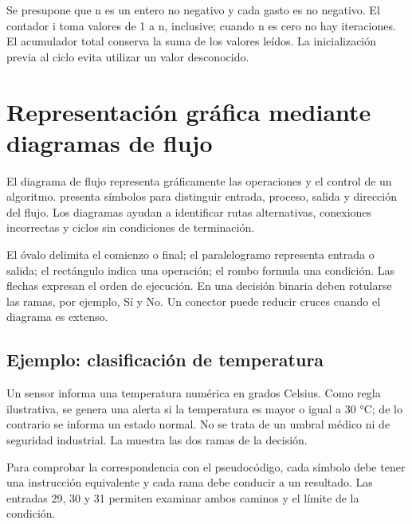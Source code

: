 
Se presupone que n es un entero no negativo y cada gasto es no negativo. El contador i toma valores de 1 a n, inclusive; cuando n es cero no hay iteraciones. El acumulador total conserva la suma de los valores leídos. La inicialización previa al ciclo evita utilizar un valor desconocido.

\section{Representación gráfica mediante diagramas de flujo}

El diagrama de flujo representa gráficamente las operaciones y el control de un algoritmo. \textcite[pp.~16–19]{farrell2013} presenta símbolos para distinguir entrada, proceso, salida y dirección del flujo. Los diagramas ayudan a identificar rutas alternativas, conexiones incorrectas y ciclos sin condiciones de terminación.


El óvalo delimita el comienzo o final; el paralelogramo representa entrada o salida; el rectángulo indica una operación; el rombo formula una condición. Las flechas expresan el orden de ejecución. En una decisión binaria deben rotularse las ramas, por ejemplo, Sí y No. Un conector puede reducir cruces cuando el diagrama es extenso.

\subsection{Ejemplo: clasificación de temperatura}

Un sensor informa una temperatura numérica en grados Celsius. Como regla ilustrativa, se genera una alerta si la temperatura es mayor o igual a 30 °C; de lo contrario se informa un estado normal. No se trata de un umbral médico ni de seguridad industrial. La  muestra las dos ramas de la decisión.


Para comprobar la correspondencia con el pseudocódigo, cada símbolo debe tener una instrucción equivalente y cada rama debe conducir a un resultado. Las entradas 29, 30 y 31 permiten examinar ambos caminos y el límite de la condición.

